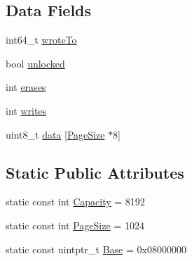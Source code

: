 \subsection*{Data Fields}
\begin{DoxyCompactItemize}
\item 
int64\+\_\+t \hyperlink{structMockFlash_a79fba38bdcda21429f6ec6f4716cdcfd}{wrote\+To}
\item 
bool \hyperlink{structMockFlash_a6aabd2652225b8cef0cd4c22eb23b971}{unlocked}
\item 
int \hyperlink{structMockFlash_a8d89a728bd9cbc547a679779e0d87566}{erases}
\item 
int \hyperlink{structMockFlash_ac495930be3e839f785226c3b0723e979}{writes}
\item 
uint8\+\_\+t \hyperlink{structMockFlash_af5c70a6bac20730ccf3eee2b969d3d41}{data} \mbox{[}\hyperlink{structMockFlash_a87985bd91e713fc6543801fd308e5406}{Page\+Size} $\ast$8\mbox{]}
\end{DoxyCompactItemize}
\subsection*{Static Public Attributes}
\begin{DoxyCompactItemize}
\item 
static const int \hyperlink{structMockFlash_a03e630b5d32b831488ccebf392fe2bee}{Capacity} = 8192
\item 
static const int \hyperlink{structMockFlash_a87985bd91e713fc6543801fd308e5406}{Page\+Size} = 1024
\item 
static const uintptr\+\_\+t \hyperlink{structMockFlash_a16af64fcebb5ed292e35f7b2f5be7565}{Base} = 0x08000000
\end{DoxyCompactItemize}


